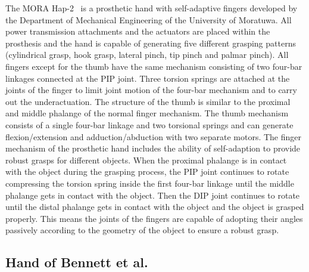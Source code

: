 \documentclass[a4paper, 10pt, conference]{ieeeconf}      %
\begin{document}
The MORA Hap-2~\cite{morahap2} is a prosthetic hand with self-adaptive fingers developed by the Department of Mechanical Engineering of the University of Moratuwa. All power transmission attachments and the actuators are placed within the prosthesis and the hand is capable of generating five different grasping patterns (cylindrical grasp, hook grasp, lateral pinch, tip pinch and palmar pinch). All fingers except for the thumb have the same mechanism consisting of two four-bar linkages connected at the PIP joint. Three torsion springs are attached at the joints of the finger to limit joint motion of the four-bar mechanism and to carry out the underactuation. The structure of the thumb is similar to the proximal and middle phalange of the normal finger mechanism. The thumb mechanism consists of a single four-bar linkage and two torsional springs and can generate flexion/extension and adduction/abduction with two separate motors. The finger mechanism of the prosthetic hand includes the ability of self-adaption to provide robust grasps for different objects. When the proximal phalange is in contact with the object during the grasping process, the PIP joint continues to rotate compressing the torsion spring inside the first four-bar linkage until the middle phalange gets in contact with the object. Then the DIP joint continues to rotate until the distal phalange gets in contact with the object and the object is grasped properly. This means the joints of the fingers are capable of adopting their angles passively according to the geometry of the object to ensure a robust grasp.

\subsection{Hand of Bennett et al.}
\end{document}
